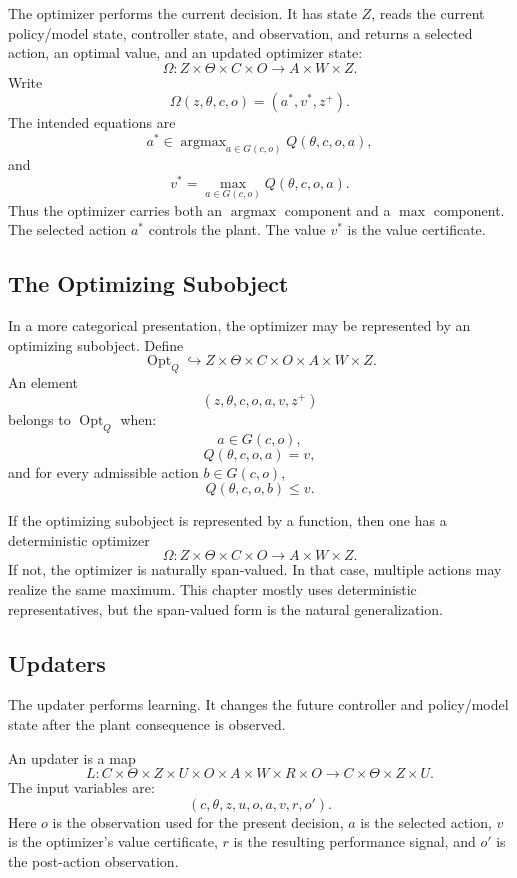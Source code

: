 The optimizer performs the current decision.  It has state \(Z\), reads the current policy/model
state, controller state, and observation, and returns a selected action, an optimal value, and an
updated optimizer state:
\[
\Omega:Z\times \Theta\times C\times O\longrightarrow A\times W\times Z.
\]
Write
\[
\Omega(z,\theta,c,o)=(a^*,v^*,z^+).
\]
The intended equations are
\[
a^*\in \operatorname{argmax}_{a\in G(c,o)} Q(\theta,c,o,a),
\]
and
\[
v^*=\max_{a\in G(c,o)} Q(\theta,c,o,a).
\]
Thus the optimizer carries both an \(\operatorname{argmax}\) component and a \(\max\) component.
The selected action \(a^*\) controls the plant.  The value \(v^*\) is the value certificate.

\subsection{The Optimizing Subobject}
\label{subsec:optimizing-subobject}

In a more categorical presentation, the optimizer may be represented by an optimizing subobject.
Define
\[
\operatorname{Opt}_Q
\hookrightarrow
Z\times\Theta\times C\times O\times A\times W\times Z.
\]
An element
\[
(z,\theta,c,o,a,v,z^+)
\]
belongs to \(\operatorname{Opt}_Q\) when:
\[
a\in G(c,o),
\]
\[
Q(\theta,c,o,a)=v,
\]
and for every admissible action \(b\in G(c,o)\),
\[
Q(\theta,c,o,b)\leq v.
\]

If the optimizing subobject is represented by a function, then one has a deterministic optimizer
\[
\Omega:Z\times\Theta\times C\times O\longrightarrow A\times W\times Z.
\]
If not, the optimizer is naturally span-valued.  In that case, multiple actions may realize the
same maximum.  This chapter mostly uses deterministic representatives, but the span-valued form is
the natural generalization.

\subsection{Updaters}
\label{subsec:updaters}

The updater performs learning.  It changes the future controller and policy/model state after the
plant consequence is observed.

An updater is a map
\[
L:
C\times\Theta\times Z\times U
\times O\times A\times W\times R\times O
\longrightarrow
C\times\Theta\times Z\times U.
\]
The input variables are:
\[
(c,\theta,z,u,o,a,v,r,o').
\]
Here \(o\) is the observation used for the present decision, \(a\) is the selected action, \(v\)
is the optimizer's value certificate, \(r\) is the resulting performance signal, and \(o'\) is the
post-action observation.

